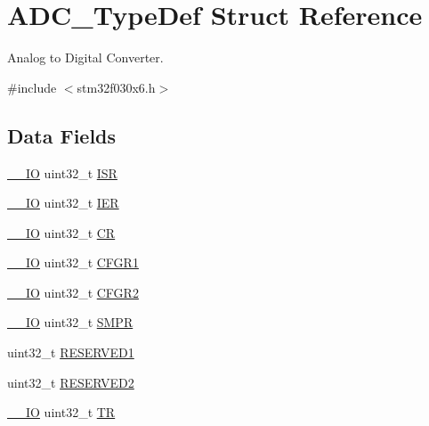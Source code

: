 \hypertarget{struct_a_d_c___type_def}{}\section{A\+D\+C\+\_\+\+Type\+Def Struct Reference}
\label{struct_a_d_c___type_def}


Analog to Digital Converter.  




{\ttfamily \#include $<$stm32f030x6.\+h$>$}

\subsection*{Data Fields}
\begin{DoxyCompactItemize}
\item 
\hyperlink{core__sc300_8h_aec43007d9998a0a0e01faede4133d6be}{\+\_\+\+\_\+\+IO} uint32\+\_\+t \hyperlink{struct_a_d_c___type_def_ab3c49a96815fcbee63d95e1e74f20e75}{I\+SR}
\item 
\hyperlink{core__sc300_8h_aec43007d9998a0a0e01faede4133d6be}{\+\_\+\+\_\+\+IO} uint32\+\_\+t \hyperlink{struct_a_d_c___type_def_a6566f8cfbd1d8aa7e8db046aa35e77db}{I\+ER}
\item 
\hyperlink{core__sc300_8h_aec43007d9998a0a0e01faede4133d6be}{\+\_\+\+\_\+\+IO} uint32\+\_\+t \hyperlink{struct_a_d_c___type_def_ab40c89c59391aaa9d9a8ec011dd0907a}{CR}
\item 
\hyperlink{core__sc300_8h_aec43007d9998a0a0e01faede4133d6be}{\+\_\+\+\_\+\+IO} uint32\+\_\+t \hyperlink{struct_a_d_c___type_def_a7a12ab903dcfa91c96beb2e36562eed6}{C\+F\+G\+R1}
\item 
\hyperlink{core__sc300_8h_aec43007d9998a0a0e01faede4133d6be}{\+\_\+\+\_\+\+IO} uint32\+\_\+t \hyperlink{struct_a_d_c___type_def_ad587bd6f59142b90c879b7c8aaf1bb8c}{C\+F\+G\+R2}
\item 
\hyperlink{core__sc300_8h_aec43007d9998a0a0e01faede4133d6be}{\+\_\+\+\_\+\+IO} uint32\+\_\+t \hyperlink{struct_a_d_c___type_def_ad969d65fa03d3b7940bbc4250b773893}{S\+M\+PR}
\item 
uint32\+\_\+t \hyperlink{struct_a_d_c___type_def_ac4ac04e673b5b8320d53f7b0947db902}{R\+E\+S\+E\+R\+V\+E\+D1}
\item 
uint32\+\_\+t \hyperlink{struct_a_d_c___type_def_a4c9b972a304c0e08ca27cbe57627c496}{R\+E\+S\+E\+R\+V\+E\+D2}
\item 
\hyperlink{core__sc300_8h_aec43007d9998a0a0e01faede4133d6be}{\+\_\+\+\_\+\+IO} uint32\+\_\+t \hyperlink{struct_a_d_c___type_def_a63d179b7a36a715dce7203858d3be132}{TR}

\end{DoxyCompactItemize}
